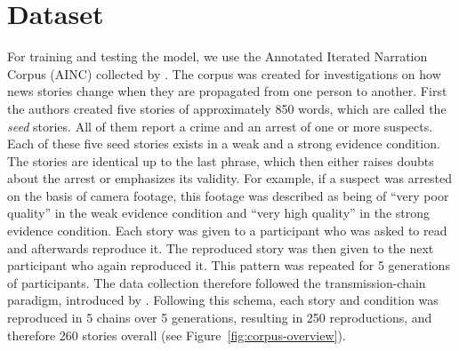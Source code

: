 \documentclass[11pt,a4paper]{article}
\begin{document}

\section{Dataset}
For training and testing the model, we use the Annotated Iterated Narration Corpus (AINC) collected by \cite{Kreiss:2019}. The corpus was created for investigations on how news stories change when they are propagated from one person to another. First the authors created five stories of approximately 850 words, which are called the \emph{seed} stories. All of them report a crime and an arrest of one or more suspects. Each of these five seed stories exists in a weak and a strong evidence condition. The stories are identical up to the last phrase, which then either raises doubts about the arrest or emphasizes its validity. For example, if a suspect was arrested on the basis of camera footage, this footage was described as being of ``very poor quality'' in the weak evidence condition and ``very high quality'' in the strong evidence condition. Each story was given to a participant who was asked to read and afterwards reproduce it. The reproduced story was then given to the next participant who again reproduced it. This pattern was repeated for 5 generations of participants. The data collection therefore followed the transmission-chain paradigm, introduced by \cite{Bartlett:1932}. Following this schema, each story and condition was reproduced in 5 chains over 5 generations, resulting in 250 reproductions, and therefore 260 stories overall (see Figure~\ref{fig:corpus-overview}).
\end{document}
